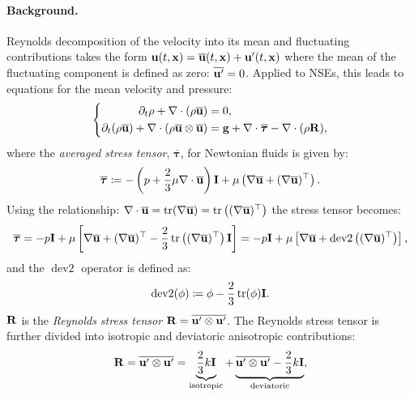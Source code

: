 \documentclass{article}
\numberwithin{equation}{section}
\begin{document}
\paragraph{Background.} Reynolds decomposition of the velocity into its mean and fluctuating contributions takes the form ${\bf u}(t,{\bf x}) = \overline{\bf u}(t,{\bf x}) + {\bf u}'(t,{\bf x})$ where the mean of the fluctuating component is defined as zero: $\overline{{\bf u}'} = 0$. Applied to NSEs, this leads to equations for the mean velocity and pressure:
\begin{equation*}
	\left\{\begin{split}
		\partial_t\rho + \nabla\cdot(\rho\overline{\bf u}) &= 0,\\
		\partial_t(\rho\overline{\bf u}) + \nabla\cdot(\rho\overline{\bf u}\otimes\overline{\bf u}) &= {\bf g} + \nabla\cdot\overline{\boldsymbol{\tau}} - \nabla\cdot(\rho{\bf R}),
	\end{split}\right.
\end{equation*}
where the \textit{averaged stress tensor}, $\overline{\boldsymbol{\tau}}$, for Newtonian fluids is given by:
\begin{align*}
	\overline{\boldsymbol{\tau}}\coloneqq-\left(p + \frac{2}{3}\mu\nabla\cdot\overline{\bf u}\right){\bf I} + \mu\left(\nabla\overline{\bf u} + (\nabla\overline{\bf u})^\top\right).
\end{align*}
Using the relationship: $\nabla\cdot\overline{\bf u} = \operatorname{tr}(\nabla\overline{\bf u}) = \operatorname{tr}\left((\nabla\overline{\bf u})^\top\right)$ the stress tensor becomes:
\begin{align*}
	\overline{\boldsymbol{\tau}} = -p{\bf I} + \mu\left[\nabla\overline{\bf u} + (\nabla\overline{\bf u})^\top - \frac{2}{3}\operatorname{tr}\left((\nabla\overline{\bf u})^\top\right){\bf I}\right] = -p{\bf I} + \mu\left[\nabla\overline{\bf u} + \operatorname{dev2}\left((\nabla\overline{\bf u})^\top\right)\right],
\end{align*}
and the $\operatorname{dev2}$ operator is defined as:
\begin{align*}
	\operatorname{dev2}(\phi)\coloneqq\phi - \frac{2}{3}\operatorname{tr}(\phi){\bf I}.
\end{align*}
${\bf R}$ is the \textit{Reynolds stress tensor} ${\bf R} = \overline{{\bf u}'\otimes{\bf u}'}$. The Reynolds stress tensor is further divided into isotropic and deviatoric anisotropic contributions:
\begin{align*}
	{\bf R} = \overline{{\bf u}'\otimes{\bf u}'} = \underbrace{\frac{2}{3}k{\bf I}}_{\rm isotropic} + \underbrace{\overline{{\bf u}'\otimes{\bf u}'} - \frac{2}{3}k{\bf I}}_{\rm deviatoric},
\end{align*}
\end{document}
